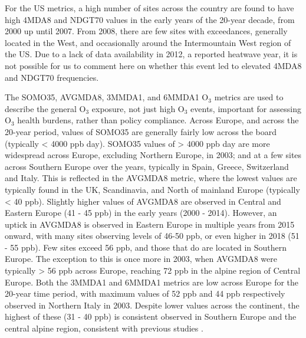 \documentclass[journal abbreviation, manuscript]{copernicus}
\begin{document}
For the US metrics, a high number of sites across the country are found to have high 4MDA8 and NDGT70 values in the early years of the 20-year decade, from 2000 up until 2007. From 2008, there are few sites with exceedances, generally located in the West, and occasionally around the Intermountain West region of the US. Due to a lack of data availability in 2012, a reported heatwave year, it is not possible for us to comment here on whether this event led to elevated 4MDA8 and NDGT70 frequencies. 

The SOMO35, AVGMDA8, 3MMDA1, and 6MMDA1 O$_3$ metrics are used to describe the general O$_3$ exposure, not just high O$_3$ events, important for assessing O$_3$ health burdens, rather than policy compliance. Across Europe, and across the 20-year period, values of SOMO35 are generally fairly low across the board (typically < 4000 ppb day). SOMO35 values of > 4000 ppb day are more widespread across Europe, excluding Northern Europe, in 2003; and at a few sites across Southern Europe over the years, typically in Spain, Greece, Switzerland and Italy. This is reflected in the AVGMDA8 metric, where the lowest values are typically found in the UK, Scandinavia, and North of mainland Europe (typically < 40 ppb). Slightly higher values of AVGMDA8 are observed in Central and Eastern Europe (41 - 45 ppb) in the early years (2000 - 2014). However, an uptick in AVGMDA8 is observed in Eastern Europe in multiple years from 2015 onward, with many sites observing levels of 46-50 ppb, or even higher in 2018 (51 - 55 ppb). Few sites exceed 56 ppb, and those that do are located in Southern Europe. The exception to this is once more in 2003, when AVGMDA8 were typically > 56 ppb across Europe, reaching 72 ppb in the alpine region of Central Europe. Both the 3MMDA1 and 6MMDA1 metrics are low across Europe for the 20-year time period, with maximum values of 52 ppb and 44 ppb respectively observed in Northern Italy in 2003. Despite lower values across the continent, the highest of these (31 - 40 ppb) is consistent observed in Southern Europe and the central alpine region, consistent with previous studies \citep{WangKeding2024}.
\end{document}
